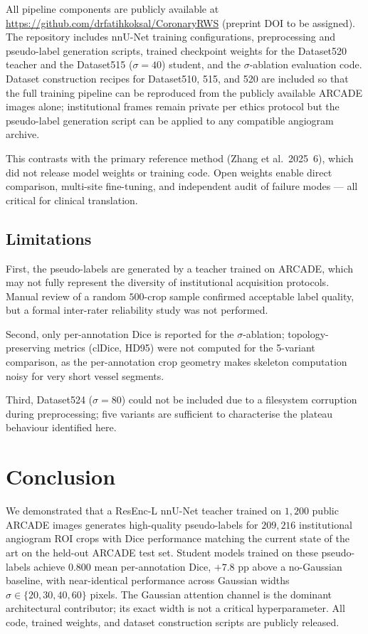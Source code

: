 \documentclass[12pt]{article}
\begin{document}
All pipeline components are publicly available at\\
\url{https://github.com/drfatihkoksal/CoronaryRWS} (preprint DOI to be assigned).
The repository includes nnU-Net training configurations, preprocessing and
pseudo-label generation scripts, trained checkpoint weights for the
Dataset520 teacher and the Dataset515 ($\sigma{=}40$) student, and the
$\sigma$-ablation evaluation code.
Dataset construction recipes for Dataset510, 515, and 520 are included so
that the full training pipeline can be reproduced from the publicly available
ARCADE images alone; institutional frames remain private per ethics protocol
but the pseudo-label generation script can be applied to any compatible
angiogram archive.

This contrasts with the primary reference method (Zhang et al.\ 2025~6), which
did not release model weights or training code.  Open weights enable direct
comparison, multi-site fine-tuning, and independent audit of failure modes
--- all critical for clinical translation.

\subsection{Limitations}

First, the pseudo-labels are generated by a teacher trained on ARCADE, which
may not fully represent the diversity of institutional acquisition protocols.
Manual review of a random $500$-crop sample confirmed acceptable label quality,
but a formal inter-rater reliability study was not performed.

Second, only per-annotation Dice is reported for the $\sigma$-ablation;
topology-preserving metrics (clDice, HD95) were not computed for the 5-variant
comparison, as the per-annotation crop geometry makes skeleton computation
noisy for very short vessel segments.

Third, Dataset524 ($\sigma{=}80$) could not be included due to a filesystem
corruption during preprocessing; five variants are sufficient to characterise
the plateau behaviour identified here.

\section{Conclusion}

We demonstrated that a ResEnc-L nnU-Net teacher trained on $1{,}200$ public
ARCADE images generates high-quality pseudo-labels for $209{,}216$ institutional
angiogram ROI crops with Dice performance matching the current state of the art
on the held-out ARCADE test set. Student models trained on these pseudo-labels
achieve $0.800$ mean per-annotation Dice, $+7.8$ pp above a no-Gaussian
baseline, with near-identical performance across Gaussian widths
$\sigma \in \{20, 30, 40, 60\}$ pixels. The Gaussian attention channel is
the dominant architectural contributor; its exact width is not a critical
hyperparameter. All code, trained weights, and dataset construction scripts are
publicly released.
\end{document}
